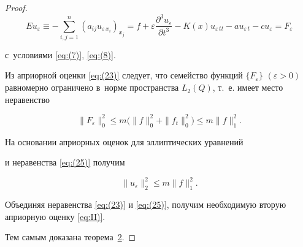 \begin{proof}
\begin{equation}

E  u_{\varepsilon } \equiv 

-\sum\limits_{i,j=1}^{n} 

(a_{ij} u_{\varepsilon \, x_i} ) _{x_j} =

f+\varepsilon \frac{\partial ^{3} {u}_{\varepsilon } }{\partial t^3}-

 K(x) {{u}_{\varepsilon \, tt}}-au_{\varepsilon \,t}-cu_{\varepsilon }= F_{\varepsilon }

\label{eq:(24)}

\end{equation}

с~условиями \eqref{eq:(7)}, \eqref{eq:(8)}.

Из априорной оценки \eqref{eq:(23)} следует, что семейство функций $ \{ F_\varepsilon \}$ $(\varepsilon >0)$ равномерно ограничено в~норме пространства ${{L}_{2}}(Q)$, т.~е. имеет место неравенство

\begin{equation}

\| F_\varepsilon \|_{0}^{2}\le m

\bigl( \| f \|_{0}^{2}+ \| f_t \|_{0}^{2} \bigr)\le m \| f \|_{1}^{2}.

\label{eq:(25)}

\end{equation} 

На основании априорных оценок для эллиптических уравнений \cite{dzhamalov:2, dzhamalov:10} %

и неравенства \eqref{eq:(25)} получим

\begin{equation}

\| {u}_{\varepsilon } \|_{2}^{2}\le m \| f \|_{1}^{2}.

\label{eq:(26)}

\end{equation} 

Объединяя неравенства \eqref{eq:(23)} и \eqref{eq:(25)}, получим необходимую вторую априорную оценку \eqref{eq:II)}.

%




Тем самым доказана теорема~\hyperlink{dzh:th2}{2}.

\end{proof}







